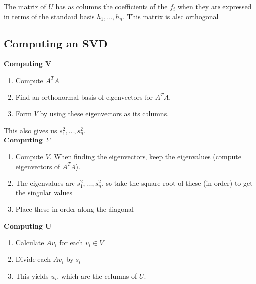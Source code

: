 \documentclass{memoir}
\begin{document}
The matrix of \(U\) has as columns the coefficients of the \(f_i\) when they are expressed in terms of the standard basis \(h_1,\ldots,h_n\). This matrix is also orthogonal.

\subsection{Computing an SVD}
\label{sec:computing_an_svd}

\textbf{Computing V}
\begin{enumerate}
	\item Compute \(A^{T}A\)
	\item Find an orthonormal basis of eigenvectors for \(A^{T}A\).
	\item Form \(V\) by using these eigenvectors as its columns.
\end{enumerate}
This also gives us \(s_1^2,\ldots,s_n^2\).\\

\textbf{Computing \(\Sigma\)}
\begin{enumerate}
	\item Compute \(V\). When finding the eigenvectors, keep the eigenvalues (compute eigenvectors of \(A^{T}A\)).
	\item The eigenvalues are \(s_1^2,\ldots,s_n^2\), so take the square root of these (in order) to get the singular values
	\item Place these in order along the diagonal
\end{enumerate}

\textbf{Computing U}
\begin{enumerate}
	\item Calculate \(Av_i\) for each \(v_i \in V\)
	\item Divide each \(Av_i \) by \(s_i\) 
	\item This yields \(u_i\), which are the columns of \(U\).
\end{enumerate}
\end{document}
